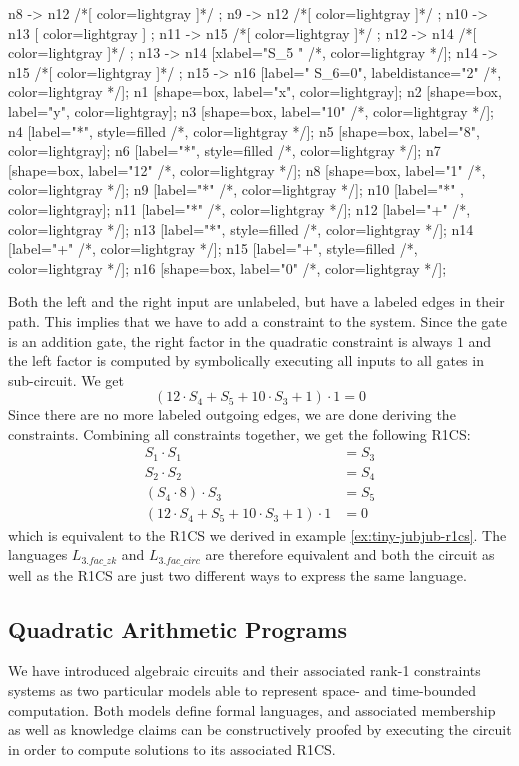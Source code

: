 \begin{example}
\begin{center}
{	n8 -> n12 /*[ color=lightgray ]*/ ;
	n9 -> n12 /*[ color=lightgray ]*/ ;
	n10 -> n13 [ color=lightgray ] ; 
	n11 -> n15 /*[ color=lightgray ]*/ ;
	n12 -> n14 /*[ color=lightgray ]*/ ;	
	n13 -> n14 [xlabel="S_5  "  /*, color=lightgray */];
	n14 -> n15 /*[ color=lightgray ]*/ ;
	n15 -> n16 [label="  S_6=0", labeldistance="2" /*, color=lightgray */];
	n1 [shape=box, label="x", color=lightgray];
	n2 [shape=box, label="y", color=lightgray];
	n3 [shape=box, label="10" /*, color=lightgray */];
	n4 [label="*", style=filled /*, color=lightgray */];
	n5 [shape=box, label="8", color=lightgray];
	n6 [label="*", style=filled /*, color=lightgray */];
	n7 [shape=box, label="12" /*, color=lightgray */];
	n8 [shape=box, label="1" /*, color=lightgray */];
	n9 [label="*" /*, color=lightgray */];
	n10 [label="*" , color=lightgray];
	n11 [label="*" /*, color=lightgray */];	
	n12 [label="+" /*, color=lightgray */];	
	n13 [label="*", style=filled /*, color=lightgray */];
	n14 [label="+" /*, color=lightgray */];
	n15 [label="+", style=filled /*, color=lightgray */];
	n16 [shape=box, label="0" /*, color=lightgray */];		
}
\end{center}
Both the left and the right input are  unlabeled, but have a labeled edges in their path. This implies that we have to add a constraint to the system. Since the gate is an addition gate, the right factor in the quadratic constraint is always $1$ and the left factor is computed by symbolically executing all inputs to all gates in sub-circuit. We get
$$
(12\cdot S_4 + S_5 + 10\cdot S_3 + 1)\cdot 1 = 0
$$
Since there are no more labeled outgoing edges, we are done deriving the constraints. Combining all constraints together, we get the following R1CS:
\begin{align*}
 S_1 \cdot S_1 &= S_3\\
 S_2 \cdot S_2 &= S_4\\
 (S_4\cdot 8)\cdot S_3 &= S_5\\
 (12\cdot S_4 + S_5 + 10\cdot S_3 + 1)\cdot 1 &= 0
\end{align*}
which is equivalent to the R1CS we derived in example \ref{ex:tiny-jubjub-r1cs}. The languages $L_{3.fac\_zk}$ and $L_{3.fac\_circ}$ are therefore equivalent and both the circuit as well as the R1CS are just two different ways to express the same language.
\end{example}
\subsection{Quadratic Arithmetic Programs} We have introduced algebraic circuits and their associated rank-1 constraints systems as two particular models able to represent space- and time-bounded computation. Both models define formal languages, and associated membership as well as knowledge claims can be constructively proofed by executing the circuit in order to compute solutions to its associated R1CS. 

